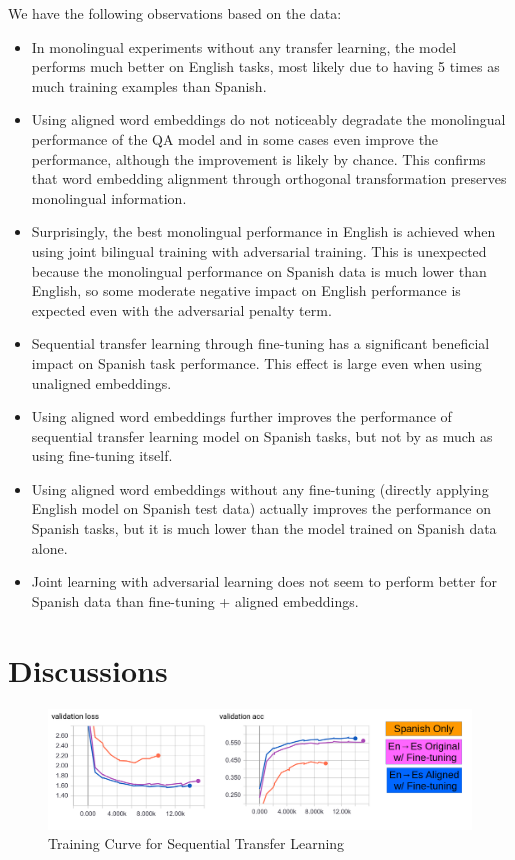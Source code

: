 \documentclass[]{article}
\begin{document}
We have the following observations based on the data:
\begin{itemize}
	\item In monolingual experiments without any transfer learning, the model performs much better on English tasks, most likely due to having 5 times as much training examples than Spanish.
	\item Using aligned word embeddings do not noticeably degradate the monolingual performance of the QA model and in some cases even improve the performance, although the improvement is likely by chance. This confirms that word embedding alignment through orthogonal transformation preserves monolingual information.
	\item Surprisingly, the best monolingual performance in English is achieved when using joint bilingual training with adversarial training. This is unexpected because the monolingual performance on Spanish data is much lower than English, so some moderate negative impact on English performance is expected even with the adversarial penalty term.
	\item Sequential transfer learning through fine-tuning has a significant beneficial impact on Spanish task performance. This effect is large even when using unaligned embeddings.
	\item Using aligned word embeddings further improves the performance of sequential transfer learning model on Spanish tasks, but not by as much as using fine-tuning itself.
	\item Using aligned word embeddings without any fine-tuning (directly applying English model on Spanish test data) actually improves the performance on Spanish tasks, but it is much lower than the model trained on Spanish data alone.
	\item Joint learning with adversarial learning does not seem to perform better for Spanish data than fine-tuning + aligned embeddings.
\end{itemize} 


\section{Discussions}

\begin{center}
	\begin{figure}
		\includegraphics[width=\linewidth]{media/curve.png}
		\caption{Training Curve for Sequential Transfer Learning}
		\label{fig:curve}
	\end{figure}
\end{center}
\end{document}
